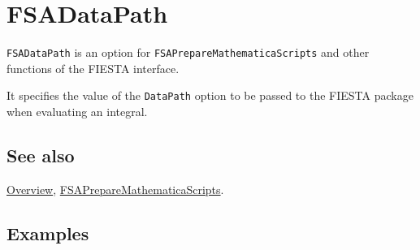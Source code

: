 \documentclass[../FeynHelpersManual.tex]{subfiles}
\begin{document}
\hypertarget{fsadatapath}{
\section{FSADataPath}\label{fsadatapath}}

\texttt{FSADataPath} is an option for
\texttt{FSAPrepareMathematicaScripts} and other functions of the FIESTA
interface.

It specifies the value of the \texttt{DataPath} option to be passed to
the FIESTA package when evaluating an integral.

\subsection{See also}

\hyperlink{toc}{Overview},
\hyperlink{fsapreparemathematicascripts}{FSAPrepareMathematicaScripts}.

\subsection{Examples}
\end{document}

